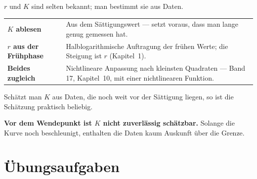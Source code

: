 \begin{merksatz}
$r$ und $K$ sind selten bekannt; man bestimmt sie aus Daten.

\begin{center}
{\small
\renewcommand{\arraystretch}{1.5}
\begin{tabular}{@{}P{2.4cm}P{6.2cm}@{}}
\toprule
\textbf{$K$ ablesen} & Aus dem Sättigungswert --- setzt voraus, dass man lange genug gemessen hat.\\
\textbf{$r$ aus der Frühphase} & Halblogarithmische Auftragung der frühen Werte; die Steigung ist $r$ (Kapitel~1).\\
\textbf{Beides zugleich} & Nichtlineare Anpassung nach kleinsten Quadraten --- Band 17, Kapitel~10, mit einer nichtlinearen Funktion.\\
\bottomrule
\end{tabular}}
\end{center}

Schätzt man $K$ aus Daten, die noch weit vor der Sättigung liegen, so ist die Schätzung praktisch beliebig.

\begin{center}
\begin{minipage}{0.88\textwidth}
\end{minipage}
\end{center}

\begin{center}
\begin{minipage}{0.9\textwidth}
\textbf{Vor dem Wendepunkt ist $K$ nicht zuverlässig schätzbar.} Solange die Kurve noch beschleunigt, enthalten die Daten kaum Auskunft über die Grenze.
\end{minipage}
\end{center}
\end{merksatz}

\section{Übungsaufgaben}

